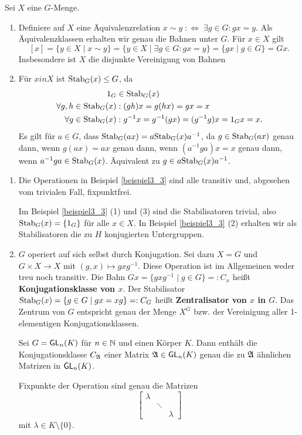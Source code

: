 \begin{rem}\label{rem3_5}
	Sei $X$ eine $G$-Menge.
	\begin{enumerate}[label=(\roman*)]
		\item Definiere auf $X$ eine Äquivalenzrelation $x \sim y \;:\Leftrightarrow\; \exists g \in G : gx = y$. Als Äquivalenzklassen erhalten wir genau die Bahnen unter $G$. Für $x \in X$ gilt
		\[[x] = \{y \in X \mid x \sim y\} = \{y \in X \mid \exists g \in G : gx = y\} = \{gx \mid g \in G\} = Gx.\]
		Insbesondere ist $X$ die disjunkte Vereinigung von Bahnen
		
		\item Für $x in X$ ist $\mathrm{Stab}_G(x) \leq G$, da
		\begin{align*}
			1_G &\in \mathrm{Stab}_G(x)\\
			\forall g,h \in \mathrm{Stab}_G(x) &: (gh)x = g(hx) = gx = x\\
			\forall g \in \mathrm{Stab}_G(x) &: g^{-1}x = g^{-1}(gx) = (g^{-1}g)x = 1_G x = x.
		\end{align*}
		Es gilt für $a \in G$, dass $\mathrm{Stab}_G(ax) = a\mathrm{Stab}_G(x) a^{-1}$, da $g \in \mathrm{Stab}_G(ax)$ genau dann, wenn $g(ax) = ax$ genau dann, wenn $(a^{-1}ga)x = x$ genau dann, wenn $a^{-1}ga \in \mathrm{Stab}_G(x)$. Äquivalent zu $g \in a\mathrm{Stab}_G(x) a^{-1}$.
	\end{enumerate}
\end{rem}
\begin{beispiel}\label{beispiel3_6}
	\begin{enumerate}[label=(\arabic*)]
		\item Die Operationen in Beispiel \ref{beispiel3_3} sind alle transitiv und, abgesehen vom trivialen Fall, fixpunktfrei.
		
		Im Beispiel \ref{beispiel3_3} (1) und (3) sind die Stabilisatoren trivial, also $\mathrm{Stab}_G(x) = \{1_G\}$ für alle $x \in X$. In Beispiel \ref{beispiel3_3} (2) erhalten wir als Stabilisatoren die zu $H$ konjugierten Untergruppen.
		
		\item $G$ operiert auf sich selbst durch Konjugation. Sei dazu $X=G$ und $G \times X \to X$ mit $(g,x) \mapsto gxg^{-1}$. Diese Operation ist im Allgemeinen weder treu noch transitiv. Die Bahn $Gx = \{gxg^{-1} \mid g \in G\} =: C_x$ heißt \textbf{Konjugationsklasse von $x$}. Der Stabilisator $\mathrm{Stab}_G(x) = \{g \in G \mid gx = xg\} =: C_G$ heißt \textbf{Zentralisator von $x$ in $G$}. Das Zentrum von $G$ entspricht genau der Menge $X^G$ bzw. der Vereinigung aller 1-elementigen Konjugationsklassen.
		
		Sei $G = \mathsf{GL}_n(K)$ für $n \in \mathbb{N}$ und einen Körper $K$. Dann enthält die Konjugationsklasse $C_{\mathfrak{A}}$ einer Matrix $\mathfrak{A} \in \mathsf{GL}_n(K)$ genau die zu $\mathfrak{A}$ ähnlichen Matrizen in $\mathsf{GL}_n(K)$.
		
		Fixpunkte der Operation sind genau die Matrizen 
		\[\begin{bmatrix}
			\lambda & & \\
			& \ddots & \\
			& & \lambda
		\end{bmatrix}\]
		mit $\lambda \in K \setminus \{0\}$.
	\end{enumerate}
\end{beispiel}
